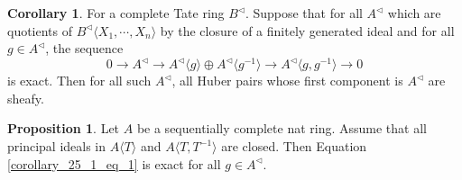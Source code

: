\documentclass[10pt]{article}
\numberwithin{equation}{section}
\theoremstyle{definition}
\newtheorem{proposition}{Proposition}[subsection]
\newtheorem{corollary}{Corollary} [subsection]
\begin{document}
\begin{corollary}
    \label{corollary_25_1}
    For a complete Tate ring $B^\triangleleft$. Suppose that for all $A^\triangleleft$ which are quotients of $B^\triangleleft\langle X_1,\cdots,X_n\rangle$ by the closure of a finitely generated ideal and for all $g\in A^\triangleleft$, the sequence 
    \begin{equation}
        0\to A^\triangleleft\to A^\triangleleft\langle g\rangle\oplus A^\triangleleft\langle g^{-1}\rangle\to A^\triangleleft\langle g,g^{-1}\rangle\to 0\label{corollary_25_1_eq_1}
    \end{equation}
    is exact. Then for all such $A^\triangleleft$, all Huber pairs whose first component is $A^\triangleleft$ are sheafy.
\end{corollary}
\begin{proposition}
    \label{proposition_25_1}
    Let $A$ be a sequentially complete nat ring. Assume that all principal ideals in $A\langle T\rangle$ and $A\langle T,T^{-1}\rangle$ are closed. Then Equation \eqref{corollary_25_1_eq_1} is exact for all $g\in A^\triangleleft$. %
\end{proposition}
\end{document}
